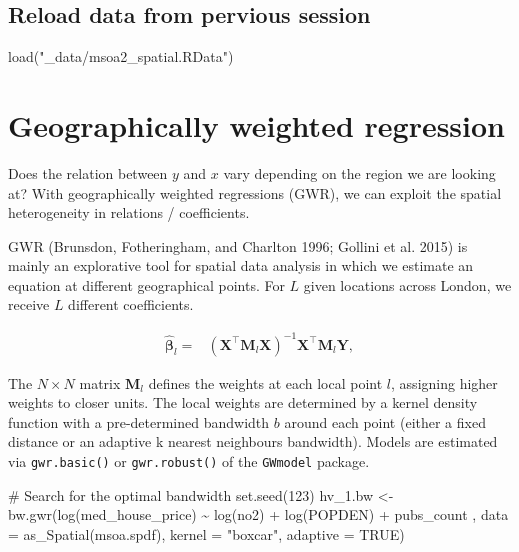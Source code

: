 \documentclass[
  letterpaper,
  DIV=11,
  numbers=noendperiod]{scrreprt}
\newenvironment{Shaded}{\begin{snugshade}}{\end{snugshade}}
\newcommand{\AttributeTok}[1]{\textcolor[rgb]{0.40,0.45,0.13}{#1}}
\newcommand{\CommentTok}[1]{\textcolor[rgb]{0.37,0.37,0.37}{#1}}
\newcommand{\ConstantTok}[1]{\textcolor[rgb]{0.56,0.35,0.01}{#1}}
\newcommand{\DecValTok}[1]{\textcolor[rgb]{0.68,0.00,0.00}{#1}}
\newcommand{\FunctionTok}[1]{\textcolor[rgb]{0.28,0.35,0.67}{#1}}
\newcommand{\NormalTok}[1]{\textcolor[rgb]{0.00,0.23,0.31}{#1}}
\newcommand{\OtherTok}[1]{\textcolor[rgb]{0.00,0.23,0.31}{#1}}
\newcommand{\SpecialCharTok}[1]{\textcolor[rgb]{0.37,0.37,0.37}{#1}}
\newcommand{\StringTok}[1]{\textcolor[rgb]{0.13,0.47,0.30}{#1}}
\begin{document}
\hypertarget{reload-data-from-pervious-session-10}{%
\subsection{Reload data from pervious
session}\label{reload-data-from-pervious-session-10}}

\begin{Shaded}
\begin{Highlighting}[]
\FunctionTok{load}\NormalTok{(}\StringTok{"\_data/msoa2\_spatial.RData"}\NormalTok{)}
\end{Highlighting}
\end{Shaded}

\hypertarget{geographically-weighted-regression}{%
\section{Geographically weighted
regression}\label{geographically-weighted-regression}}

Does the relation between \(y\) and \(x\) vary depending on the region
we are looking at? With geographically weighted regressions (GWR), we
can exploit the spatial heterogeneity in relations / coefficients.

GWR (Brunsdon, Fotheringham, and Charlton 1996; Gollini et al. 2015) is
mainly an explorative tool for spatial data analysis in which we
estimate an equation at different geographical points. For \(L\) given
locations across London, we receive \(L\) different coefficients.

\[
\begin{align} 
\hat{\boldsymbol{\mathbf{\beta}}}_l=& ({\boldsymbol{\mathbf{X}}}^\intercal{\boldsymbol{\mathbf{M}}}_l{\boldsymbol{\mathbf{X}}})^{-1}{\boldsymbol{\mathbf{X}}}^\intercal{\boldsymbol{\mathbf{M}}}_l{\boldsymbol{\mathbf{Y}}},
\end{align}
\]

The \(N \times N\) matrix \({\boldsymbol{\mathbf{M}}}_l\) defines the
weights at each local point \(l\), assigning higher weights to closer
units. The local weights are determined by a kernel density function
with a pre-determined bandwidth \(b\) around each point (either a fixed
distance or an adaptive k nearest neighbours bandwidth). Models are
estimated via \texttt{gwr.basic()} or \texttt{gwr.robust()} of the
\texttt{GWmodel} package.

\begin{Shaded}
\begin{Highlighting}[]
\CommentTok{\# Search for the optimal bandwidth }
\FunctionTok{set.seed}\NormalTok{(}\DecValTok{123}\NormalTok{)}
\NormalTok{hv\_1.bw }\OtherTok{\textless{}{-}} \FunctionTok{bw.gwr}\NormalTok{(}\FunctionTok{log}\NormalTok{(med\_house\_price) }\SpecialCharTok{\textasciitilde{}} \FunctionTok{log}\NormalTok{(no2) }\SpecialCharTok{+} \FunctionTok{log}\NormalTok{(POPDEN) }\SpecialCharTok{+}\NormalTok{ pubs\_count ,}
                  \AttributeTok{data =} \FunctionTok{as\_Spatial}\NormalTok{(msoa.spdf),}
                  \AttributeTok{kernel =} \StringTok{"boxcar"}\NormalTok{,}
                  \AttributeTok{adaptive =} \ConstantTok{TRUE}\NormalTok{) }
\end{Highlighting}
\end{Shaded}
\end{document}
